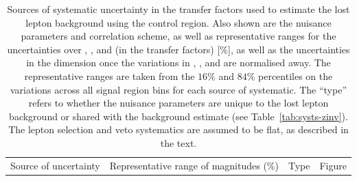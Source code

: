 \begin{table}[h!]
  \caption{Sources of systematic uncertainty in the transfer factors
    used to estimate the lost lepton background using the \mj control
    region. Also shown are the nuisance parameters and correlation
    scheme, as well as representative ranges for the uncertainties
    over \njet, \nb, and \scalht (\ie in the transfer factors) [\%],
    as well as the uncertainties in the \mht dimension once the
    variations in \njet, \nb, and \scalht are normalised away. The
    representative ranges are taken from the $16\%$ and $84\%$
    percentiles on the variations across all signal region bins for
    each source of systematic. The ``type'' refers to whether the
    nuisance parameters are unique to the lost lepton background  
    or shared with the \znunuj background estimate
    (see Table~\ref{tab:systs-zinv}). The lepton selection and veto
    systematics are assumed to be flat, as described in the text. 
  }
  \label{tab:systs-ttw}
  \centering
  \fontsize{8}{9.6}\selectfont
  \newcommand{\cat}{\njet, \scalht, \nb, \mht}
  \begin{tabular}{ llllc }
    \hline
    Source of uncertainty               & \multicolumn{2}{c}{Representative range of magnitudes (\%)} & Type & Figure \\


\end{tabular}
\end{table}
